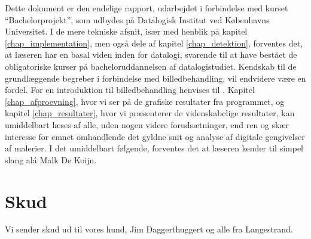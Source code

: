 {
{\sffamily Dette dokument er den endelige rapport, udarbejdet i
forbindelse med kurset ``Bachelorprojekt'', som udbydes på Datalogisk
Institut ved Københavns Universitet. I de mere tekniske afsnit, især med
henblik på kapitel \ref{chap_implementation}, men også dele af kapitel
\ref{chap_detektion}, forventes det, at læseren har en basal viden inden
for datalogi, svarende til at have bestået de obligatoriske kurser på
bacheloruddannelsen af datalogistudiet\cite{DIKUkurser}. Kendskab til de
grundlæggende begreber i forbindelse med billedbehandling, vil endvidere
være en fordel. For en introduktion til billedbehandling henvises til
\cite{SIOlsen}. Kapitel \ref{chap_afproevning}, hvor vi ser på de
grafiske resultater fra programmet, og kapitel \ref{chap_resultater},
hvor vi præsenterer de videnskabelige resultater, kan umiddelbart læses
af alle, uden nogen videre forudsætninger, end ren og skær interesse for
emnet omhandlende det gyldne snit og analyse af digitale gengivelser af
malerier. I det umiddelbart følgende, forventes det at læseren kender
til simpel slang alá Malk De Koijn.

\section*{Skud}
Vi sender skud ud til vores hund, Jim Daggerthuggert og alle fra
Langestrand.

}
}

